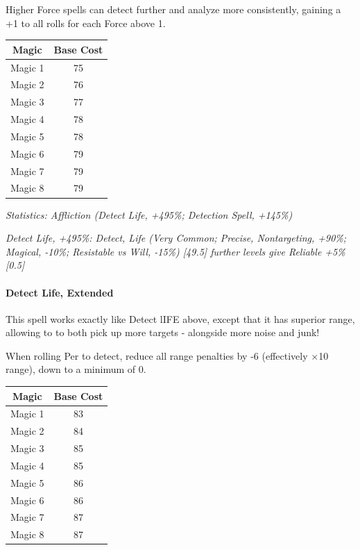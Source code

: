 \begin{multicols*}{3}
	Higher Force spells can detect further and analyze more consistently, gaining a +1 to all rolls for each Force above 1.	
	
	\begin{center}
		\begin{tabular}{|c|c|}
			\hline
			Magic & Base Cost \\
			\hline
			\hline
			Magic 1 & 75 \\
			Magic 2 & 76 \\
			Magic 3 & 77 \\
			Magic 4 & 78 \\
			Magic 5 & 78 \\
			Magic 6 & 79 \\
			Magic 7 & 79 \\
			Magic 8 & 79 \\
			\hline
		\end{tabular}
	\end{center} 	
	
	\textcolor{OliveGreen}{\textit{ Statistics: Affliction (Detect Life, +495\%; Detection Spell, +145\%) }}
	
	\textcolor{OliveGreen}{\textit{Detect Life, +495\%: Detect, Life (Very Common; Precise, Nontargeting, +90\%; Magical, -10\%; Resistable vs Will, -15\%) [49.5] further levels give Reliable +5\% [0.5]}}
	
	\paragraph{Detect Life, Extended}
	
	This spell works exactly like Detect lIFE above, except that it has superior range, allowing to to both pick up more targets - alongside more noise and junk!
	
	When rolling Per to detect, reduce all range penalties by -6 (effectively $\times$10 range), down to a minimum of 0.
	
	\begin{center}
		\begin{tabular}{|c|c|}
			\hline
			Magic & Base Cost \\
			\hline
			\hline
			Magic 1 & 83 \\
			Magic 2 & 84 \\
			Magic 3 & 85 \\
			Magic 4 & 85 \\
			Magic 5 & 86 \\
			Magic 6 & 86 \\
			Magic 7 & 87 \\
			Magic 8 & 87 \\
			\hline
		\end{tabular}
	\end{center} 
	

\end{multicols*}
